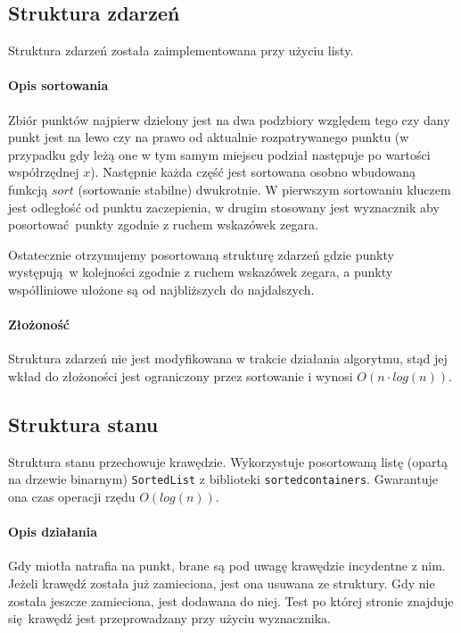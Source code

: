 \documentclass[12pt]{article}
\begin{document}
		\subsection{Struktura zdarzeń}
			Struktura zdarzeń została zaimplementowana przy użyciu listy. 
			
			\paragraph{Opis sortowania}
				Zbiór punktów najpierw dzielony jest na dwa podzbiory względem tego czy dany punkt jest na lewo czy na prawo od aktualnie rozpatrywanego punktu (w przypadku gdy leżą one w tym samym miejscu podział następuje po wartości współrzędnej $ x $). Następnie każda część jest sortowana osobno wbudowaną funkcją $ sort $ (sortowanie stabilne) dwukrotnie. W pierwszym sortowaniu kluczem jest odległość od punktu zaczepienia, w drugim stosowany jest wyznacznik aby posortować punkty zgodnie z ruchem wskazówek zegara.
			
			\vspace{\baselineskip} %
			Ostatecznie otrzymujemy posortowaną strukturę zdarzeń gdzie punkty występują w kolejności zgodnie z ruchem wskazówek zegara, a punkty współliniowe ułożone są od najbliższych do najdalszych.
			
			\paragraph{Złożoność}
				Struktura zdarzeń nie jest modyfikowana w trakcie działania algorytmu, stąd jej wkład do złożoności jest ograniczony przez sortowanie i wynosi $ O(n \cdot log(n)) $.
		
		\subsection{Struktura stanu}
			Struktura stanu przechowuje krawędzie. Wykorzystuje posortowaną listę (opartą na drzewie binarnym) \lstinline|SortedList| z biblioteki \lstinline|sortedcontainers|. Gwarantuje ona czas operacji rzędu $ O(log(n)) $.
			
			\paragraph{Opis działania}
				Gdy miotła natrafia na punkt, brane są pod uwagę krawędzie incydentne z nim. Jeżeli krawędź została już zamieciona, jest ona usuwana ze struktury. Gdy nie została jeszcze zamieciona, jest dodawana do niej. Test po której stronie znajduje się krawędź jest przeprowadzany przy użyciu wyznacznika.
				
\end{document}
